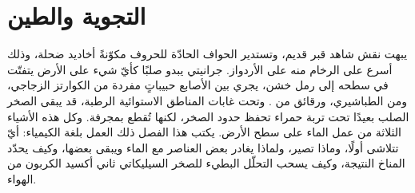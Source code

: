 \chapter{التجوية والطين}\label{ch:b1:weathering-clays}

يبهت نقش شاهد قبر قديم، وتستدير الحواف الحادّة للحروف مكوّنةً أخاديد ضحلة، وذلك أسرع على الرخام منه على الأردواز.  جرانيتي يبدو صلبًا كأيّ شيء على الأرض يتفتّت في سطحه إلى رمل خشن، يجري بين الأصابع حبيباتٍ مفردة من الكوارتز الزجاجي، ومن  الطباشيري، ورقائق من . وتحت غابات المناطق الاستوائية الرطبة، قد يبقى الصخر الصلب بعيدًا تحت تربة حمراء تحفظ حدود  الصخر، لكنها تُقطع بمجرفة. وكل هذه الأشياء الثلاثة من عمل الماء على سطح الأرض. يكتب هذا الفصل ذلك العمل بلغة الكيمياء: أيّ  تتلاشى أولًا، وماذا تصير، ولماذا يغادر بعض العناصر مع الماء ويبقى بعضها، وكيف يحدّد المناخ النتيجة، وكيف يسحب التحلّل البطيء للصخر السيليكاتي ثاني أكسيد الكربون من الهواء.

